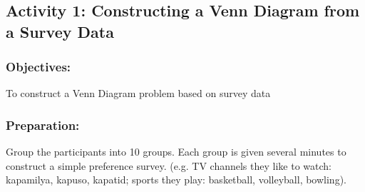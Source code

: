 \subsection*{Activity 1: Constructing a Venn Diagram from a Survey Data}
\subsubsection*{Objectives:}
To construct a Venn Diagram problem based on survey data
\subsubsection*{Preparation:}
Group the participants into 10 groups. Each group is given several minutes to construct a
simple preference survey. (e.g. TV channels they like to watch: kapamilya, kapuso, kapatid;
sports they play: basketball, volleyball, bowling).
